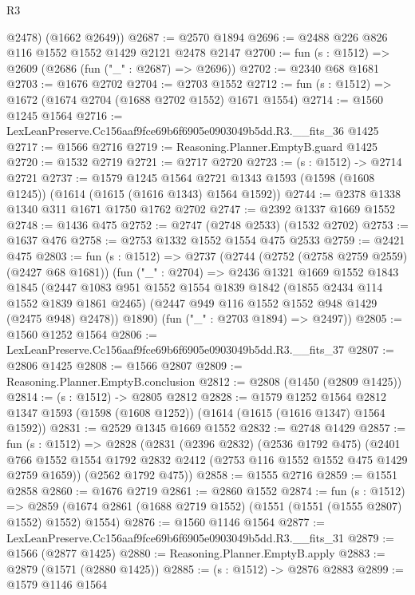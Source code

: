 \begin{lexlean}{R3}
\begin{coremodule}
        @2478)
      (@1662 @2649))
@2687 := @2570 @1894
@2696 := @2488 @226 @826 @116 @1552 @1552 @1429 @2121 @2478 @2147
@2700 := fun (s : @1512) => @2609 (@2686 (fun ("_" : @2687) => @2696))
@2702 := @2340 @68 @1681
@2703 := @1676 @2702
@2704 := @2703 @1552
@2712 := fun (s : @1512) => @1672 (@1674 @2704 (@1688 @2702 @1552) @1671 @1554)
@2714 := @1560 @1245 @1564
@2716 := LexLeanPreserve.Cc156aaf9fce69b6f6905e0903049b5dd.R3.__fits_36 @1425
@2717 := @1566 @2716
@2719 := Reasoning.Planner.EmptyB.guard @1425
@2720 := @1532 @2719
@2721 := @2717 @2720
@2723 := (s : @1512) -> @2714 @2721
@2737 := @1579
    @1245
    @1564
    @2721
    @1343
    @1593
    (@1598 (@1608 @1245))
    (@1614 (@1615 (@1616 @1343) @1564 @1592))
@2744 := @2378 @1338 @1340 @311 @1671 @1750 @1762 @2702
@2747 := @2392 @1337 @1669 @1552
@2748 := @1436 @475
@2752 := @2747 (@2748 @2533) (@1532 @2702)
@2753 := @1637 @476
@2758 := @2753 @1332 @1552 @1554 @475 @2533
@2759 := @2421 @475
@2803 := fun (s : @1512) =>
  @2737
    (@2744
      (@2752 (@2758 @2759 @2559) (@2427 @68 @1681))
      (fun ("_" : @2704) =>
      @2436
        @1321
        @1669
        @1552
        @1843
        @1845
        (@2447
          @1083
          @951
          @1552
          @1554
          @1839
          @1842
          (@1855 @2434 @114 @1552 @1839 @1861 @2465)
          (@2447 @949 @116 @1552 @1552 @948 @1429 (@2475 @948) @2478))
        @1890)
      (fun ("_" : @2703 @1894) => @2497))
@2805 := @1560 @1252 @1564
@2806 := LexLeanPreserve.Cc156aaf9fce69b6f6905e0903049b5dd.R3.__fits_37
@2807 := @2806 @1425
@2808 := @1566 @2807
@2809 := Reasoning.Planner.EmptyB.conclusion
@2812 := @2808 (@1450 (@2809 @1425))
@2814 := (s : @1512) -> @2805 @2812
@2828 := @1579
    @1252
    @1564
    @2812
    @1347
    @1593
    (@1598 (@1608 @1252))
    (@1614 (@1615 (@1616 @1347) @1564 @1592))
@2831 := @2529 @1345 @1669 @1552
@2832 := @2748 @1429
@2857 := fun (s : @1512) =>
  @2828
    (@2831
      (@2396 @2832)
      (@2536 @1792 @475)
      (@2401 @766 @1552 @1554 @1792 @2832 @2412 (@2753 @116 @1552 @1552 @475 @1429 @2759 @1659))
      (@2562 @1792 @475))
@2858 := @1555 @2716
@2859 := @1551 @2858
@2860 := @1676 @2719
@2861 := @2860 @1552
@2874 := fun (s : @1512) =>
  @2859 (@1674 @2861 (@1688 @2719 @1552) (@1551 (@1551 (@1555 @2807) @1552) @1552) @1554)
@2876 := @1560 @1146 @1564
@2877 := LexLeanPreserve.Cc156aaf9fce69b6f6905e0903049b5dd.R3.__fits_31
@2879 := @1566 (@2877 @1425)
@2880 := Reasoning.Planner.EmptyB.apply
@2883 := @2879 (@1571 (@2880 @1425))
@2885 := (s : @1512) -> @2876 @2883
@2899 := @1579
    @1146
    @1564

\end{coremodule}
\end{lexlean}
